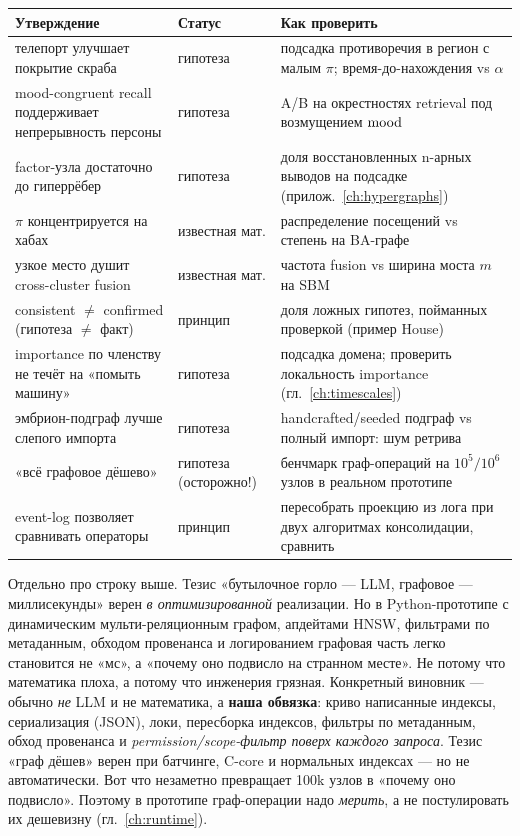 \begin{center}
\begin{tabular}{p{} p{} p{}}
\toprule
\textbf{Утверждение} & \textbf{Статус} & \textbf{Как проверить} \\
\midrule
телепорт улучшает покрытие скраба & гипотеза & подсадка противоречия в регион с малым $\pi$; время-до-нахождения vs $\alpha$ \\
mood-congruent recall поддерживает непрерывность персоны & гипотеза & A/B на окрестностях retrieval под возмущением $\mathrm{mood}$ \\
factor-узла достаточно до гиперрёбер & гипотеза & доля восстановленных n-арных выводов на подсадке (прилож.~\ref{ch:hypergraphs}) \\
$\pi$ концентрируется на хабах & известная мат. & распределение посещений vs степень на BA-графе \\
узкое место душит cross-cluster fusion & известная мат. & частота fusion vs ширина моста $m$ на SBM \\
consistent $\ne$ confirmed (гипотеза $\ne$ факт) & принцип & доля ложных гипотез, пойманных проверкой (пример House) \\
importance по членству не течёт на «помыть машину» & гипотеза & подсадка домена; проверить локальность importance (гл.~\ref{ch:timescales}) \\
эмбрион-подграф лучше слепого импорта & гипотеза & handcrafted/seeded подграф vs полный импорт: шум ретрива \\
«всё графовое дёшево» & гипотеза (осторожно!) & бенчмарк граф-операций на $10^5/10^6$ узлов в реальном прототипе \\
event-log позволяет сравнивать операторы & принцип & пересобрать проекцию из лога при двух алгоритмах консолидации, сравнить \\
\bottomrule
\end{tabular}
\end{center}

\begin{pitfall}
Отдельно про строку выше. Тезис «бутылочное горло — LLM, графовое — миллисекунды»
верен \emph{в оптимизированной} реализации. Но в Python-прототипе с динамическим
мульти-реляционным графом, апдейтами HNSW, фильтрами по метаданным, обходом
провенанса и логированием графовая часть легко становится не «мс», а «почему оно
подвисло на странном месте». Не потому что математика плоха, а потому что инженерия
грязная. Конкретный виновник — обычно \emph{не} LLM и не математика, а \textbf{наша
обвязка}: криво написанные индексы, сериализация (JSON), локи, пересборка индексов,
фильтры по метаданным, обход провенанса и \emph{permission/scope-фильтр поверх каждого
запроса}. Тезис «граф дёшев» верен при батчинге, C-core и нормальных индексах — но не
автоматически. Вот что незаметно превращает 100k узлов в «почему оно подвисло». Поэтому
в прототипе граф-операции надо \emph{мерить}, а не постулировать их дешевизну
(гл.~\ref{ch:runtime}).
\end{pitfall}
